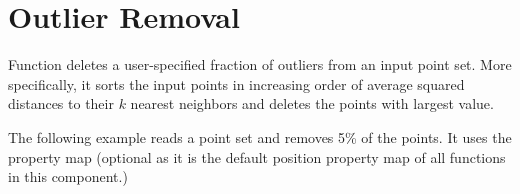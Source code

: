 \section{Outlier Removal}

Function  deletes a user-specified fraction of outliers from an input point set. More specifically, it sorts the input points in increasing order of average squared distances to their $k$ nearest neighbors and deletes the points with largest value.


\ccExample

The following example reads a point set and removes 5\% of the points. It uses the  property map (optional as it is the default position property map of all functions in this component.)

